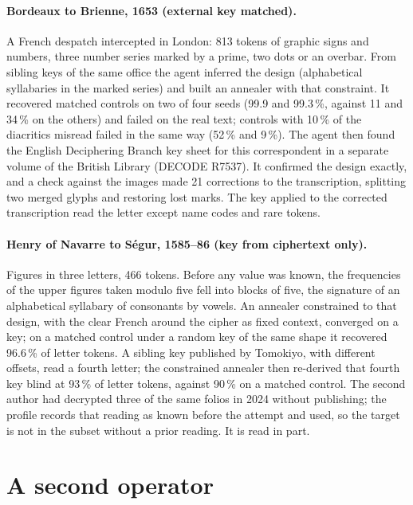 \documentclass[11pt]{article}
\begin{document}
\paragraph{Bordeaux to Brienne, 1653 (external key matched).} A French despatch intercepted in London: 813 tokens of graphic signs and numbers, three number series marked by a prime, two dots or an overbar. From sibling keys of the same office the agent inferred the design (alphabetical syllabaries in the marked series) and built an annealer with that constraint. It recovered matched controls on two of four seeds (99.9 and 99.3\,\%, against 11 and 34\,\% on the others) and failed on the real text; controls with 10\,\% of the diacritics misread failed in the same way (52\,\% and 9\,\%). The agent then found the English Deciphering Branch key sheet for this correspondent in a separate volume of the British Library (DECODE R7537). It confirmed the design exactly, and a check against the images made 21 corrections to the transcription, splitting two merged glyphs and restoring lost marks. The key applied to the corrected transcription read the letter except name codes and rare tokens.

\paragraph{Henry of Navarre to S\'egur, 1585--86 (key from ciphertext only).} Figures in three letters, 466 tokens. Before any value was known, the frequencies of the upper figures taken modulo five fell into blocks of five, the signature of an alphabetical syllabary of consonants by vowels. An annealer constrained to that design, with the clear French around the cipher as fixed context, converged on a key; on a matched control under a random key of the same shape it recovered 96.6\,\% of letter tokens. A sibling key published by Tomokiyo, with different offsets, read a fourth letter; the constrained annealer then re-derived that fourth key blind at 93\,\% of letter tokens, against 90\,\% on a matched control. The second author had decrypted three of the same folios in 2024 without publishing; the profile records that reading as known before the attempt and used, so the target is not in the subset without a prior reading. It is read in part.

\section{A second operator}
\label{sec:second}
\end{document}
